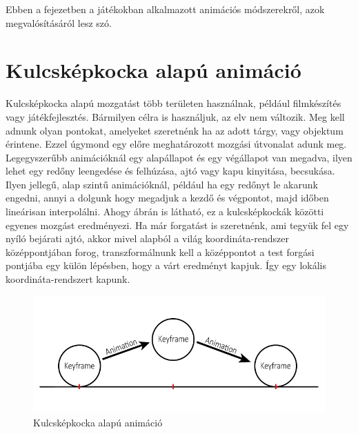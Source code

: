 \label{Chap:animacio}

%
%
%

Ebben a fejezetben a játékokban alkalmazott animációs módszerekről, azok megvalósításáról lesz szó.


\section{Kulcsképkocka alapú animáció}

Kulcsképkocka alapú mozgatást több területen használnak, például filmkészítés vagy játékfejlesztés. Bármilyen célra is használjuk, az elv nem változik. Meg kell adnunk olyan pontokat, amelyeket szeretnénk ha az adott tárgy, vagy objektum érintene. Ezzel úgymond egy előre meghatározott mozgási útvonalat adunk meg. Legegyszerűbb animációknál egy alapállapot és egy végállapot van megadva, ilyen lehet egy redőny leengedése és felhúzása, ajtó vagy kapu kinyitása, becsukása. Ilyen jellegű, alap szintű animációknál, például ha egy redőnyt le akarunk engedni, annyi a dolgunk hogy megadjuk a kezdő és végpontot, majd időben lineárisan interpolálni. Ahogy  ábrán is látható, ez a kulcsképkockák közötti egyenes mozgást eredményezi. Ha már forgatást is szeretnénk, ami tegyük fel egy nyíló bejárati ajtó, akkor mivel alapból a világ koordináta-rendszer középpontjában forog, transzformálnunk kell a középpontot a test forgási pontjába egy külön lépésben, hogy a várt eredményt kapjuk. Így egy lokális koordináta-rendszert kapunk.

\begin{figure}[h]
\centering
\includegraphics[scale=0.5]{kepek/keyframe_anim.png}
\caption{Kulcsképkocka alapú animáció}
\label{fig:keyframe}
\end{figure}

